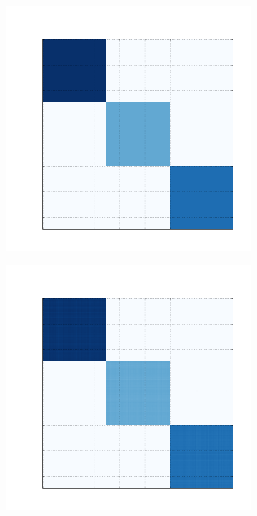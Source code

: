 \documentclass[10pt]{beamer}
\begin{document}
\begin{frame}
\begin{figure}[H]
\begin{subfigure}[b]{0.13\textwidth}
      \end{subfigure}
      \begin{subfigure}[b]{0.13\textwidth}
          \includegraphics[width=\textwidth]{img/b-reconstruction-fnmtf.png}
      \end{subfigure}
      \begin{subfigure}[b]{0.13\textwidth}
          \includegraphics[width=\textwidth]{img/b-reconstruction-ovnmtf.png}

\end{subfigure}
\end{figure}
\end{frame}
\end{document}
